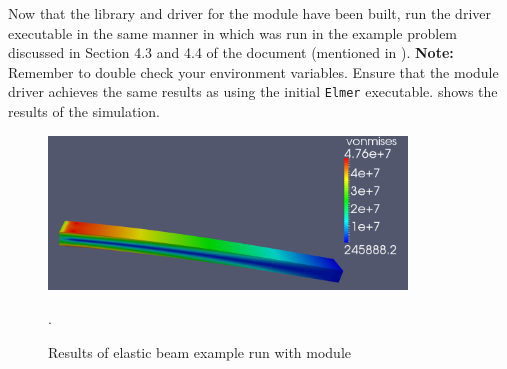 
Now that the library and driver for the module have been built, run the driver executable in the same manner in which \elmer was run in the example problem discussed in Section 4.3 and 4.4 of the  document (mentioned in ). \textbf{Note:} Remember to double check your environment variables. Ensure that the module driver achieves the same results as using the initial \texttt{Elmer} executable.  shows the results of the simulation.
 
\begin{figure}[H]    
\centering
\includegraphics[width=0.85\textwidth]{../Figures/elasticbeam.png}
\caption{Results of elastic beam example run with  module}.
\label{fig:elasticBeam}
\end{figure}
